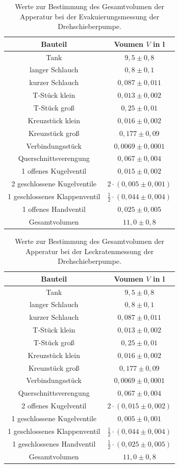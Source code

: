 \begin{table}[H]
\centering
\caption{Werte zur Bestimmung des Gesamtvolumen der Apperatur bei der Evakuierungsmessung der Drehschieberpumpe.}
\label{tab:Volumen_ED}
\begin{tabular}{c|c}
Bauteil & Voumen $V$ in l\\
\hline
Tank &$9,5 \pm 0,8$\\
langer Schlauch &$0,8 \pm 0,1$\\
kurzer Schlauch &$0,087 \pm 0,011$\\
T-Stück klein&$0,013 \pm 0,002$\\
T-Stück groß &$0,25 \pm 0,01$\\
Kreuzstück klein&$0,016 \pm 0,002$\\
Kreuzstück groß&$0,177 \pm 0,09$\\
Verbindungsstück&$0,0069 \pm 0,0001$\\
Querschnittsverengung&$0,067 \pm 0,004$\\
1 offenes Kugelventil&$0,015 \pm 0,002$\\
2 geschlossene Kugelventile&$ 2 \cdot(0,005 \pm 0,001)$\\
1 geschlossenes Klappenventil&$\frac{1}{2}\cdot(0,044 \pm 0,004)$\\
1 offenes Handventil&$0,025 \pm 0,005$\\
\hline
Gesamtvolumen&$11,0 \pm 0,8$\\
\end{tabular}
\end{table}

\begin{table}[H]
\centering
\caption{Werte zur Bestimmung des Gesamtvolumen der Apperatur bei der Leckratenmessung der Drehschieberpumpe.}
\label{tab:Volumen_LD}
\begin{tabular}{c|c}
Bauteil & Voumen $V$ in l\\
\hline
Tank &$9,5 \pm 0,8$\\
langer Schlauch &$0,8 \pm 0,1$\\
kurzer Schlauch &$0,087 \pm 0,011$\\
T-Stück klein&$0,013 \pm 0,002$\\
T-Stück groß &$0,25 \pm 0,01$\\
Kreuzstück klein&$0,016 \pm 0,002$\\
Kreuzstück groß&$0,177 \pm 0,09$\\
Verbindungsstück&$0,0069 \pm 0,0001$\\
Querschnittsverengung&$0,067 \pm 0,004$\\
2 offenes Kugelventil&$2\cdot(0,015 \pm 0,002)$\\
1 geschlossene Kugelventile&$ 0,005 \pm 0,001$\\
1 geschlossenes Klappenventil&$\frac{1}{2}\cdot(0,044 \pm 0,004)$\\
1 geschlossenes Handventil&$\frac{1}{2}\cdot(0,025 \pm 0,005)$\\
\hline
Gesamtvolumen&$11,0 \pm 0,8$\\
\end{tabular}
\end{table}
